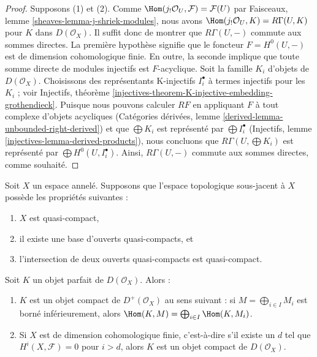 \begin{proof}

Supposons (1) et (2). Comme
$\Hom(j_!\mathcal{O}_U, \mathcal{F}) = \mathcal{F}(U)$
par Faisceaux, lemme \ref{sheaves-lemma-j-shriek-modules},
nous avons $\Hom(j_!\mathcal{O}_U, K) = R\Gamma(U, K)$ pour
$K$ dans $D(\mathcal{O}_X)$. Il suffit donc de montrer que $R\Gamma(U, -)$ commute aux sommes directes.
La première hypothèse signifie que le foncteur
$F = H^0(U, -)$ est de dimension cohomologique finie. En outre, la seconde implique que toute somme directe de modules injectifs est $F$-acyclique. Soit la famille $K_i$ d'objets de $D(\mathcal{O}_X)$. Choisissons des représentants K-injectifs $I_i^\bullet$ à termes injectifs pour les $K_i$ ; voir Injectifs, théorème
\ref{injectives-theorem-K-injective-embedding-grothendieck}. Puisque nous pouvons calculer $RF$ en appliquant $F$ à tout complexe d'objets acycliques (Catégories dérivées, lemme \ref{derived-lemma-unbounded-right-derived}) et que $\bigoplus K_i$ est représenté par $\bigoplus I_i^\bullet$
(Injectifs, lemme \ref{injectives-lemma-derived-products}), nous concluons que $R\Gamma(U, \bigoplus K_i)$ est représenté par
$\bigoplus H^0(U, I_i^\bullet)$. Ainsi, $R\Gamma(U, -)$ commute aux sommes directes, comme souhaité.

\end{proof}

\begin{lemma}

\label{lemma-perfect-is-compact}

Soit $X$ un espace annelé. Supposons que l'espace topologique sous-jacent à $X$ possède les propriétés suivantes :

\begin{enumerate}

\item  $X$ est quasi-compact,
\item il existe une base d'ouverts quasi-compacts, et
\item l'intersection de deux ouverts quasi-compacts est quasi-compact.

\end{enumerate}

Soit $K$ un objet parfait de $D(\mathcal{O}_X)$. Alors :

\begin{enumerate}

\item[(a)] $K$ est un objet compact de $D^+(\mathcal{O}_X)$
au sens suivant : si $M = \bigoplus_{i \in I} M_i$ est borné inférieurement, alors $\Hom(K, M) = \bigoplus_{i \in I} \Hom(K, M_i)$.
\item[b)] Si $X$ est de dimension cohomologique finie, c'est-à-dire s'il existe un $d$ tel que $H^i(X, \mathcal{F}) = 0$ pour $i > d$, alors
$K$ est un objet compact de $D(\mathcal{O}_X)$.

\end{enumerate}

\end{lemma}

